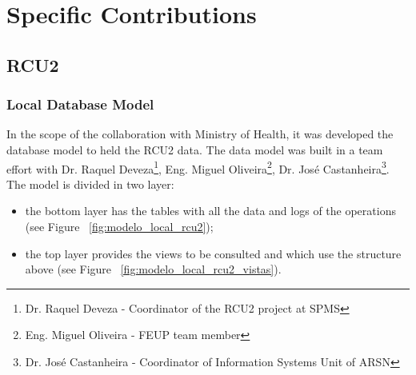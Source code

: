 \chapter{Specific Contributions} \label{ap1:rcu2_db}

\section{RCU2}

\subsection{Local Database Model}

In the scope of the collaboration with Ministry of Health, it was developed the database model to held the RCU2 data. The data model was built in a team effort with Dr. Raquel Deveza\footnote{Dr. Raquel Deveza - Coordinator of the RCU2 project at SPMS}, Eng. Miguel Oliveira\footnote{Eng. Miguel Oliveira - FEUP team member}, Dr. José Castanheira\footnote{Dr. José Castanheira - Coordinator of Information Systems Unit of ARSN}. The model is divided in two layer:
\begin{itemize}
\item the bottom layer has the tables with all the data and logs of the operations (see Figure ~\ref{fig:modelo_local_rcu2});
\item the top layer provides the views to be consulted and which use the structure above (see Figure ~\ref{fig:modelo_local_rcu2_vistas}).
\end{itemize}


\begin{landscape}
\centering     %
\end{landscape}


\begin{landscape}
\centering     %
\end{landscape}

